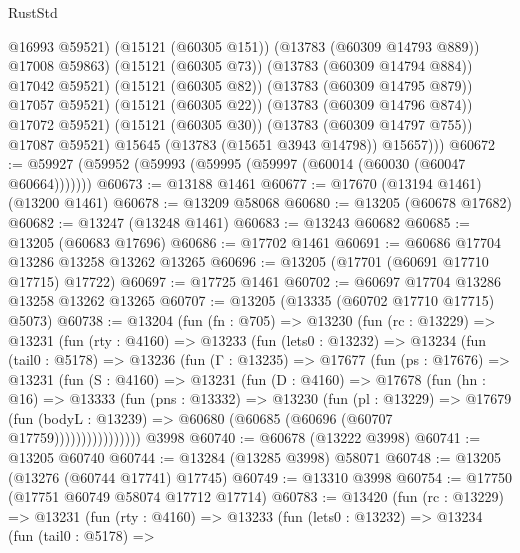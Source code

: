 \begin{lexlean}{RustStd}
\begin{coremodule}
                      @16993
                      @59521)
                    (@15121 (@60305 @151))
                    (@13783 (@60309 @14793 @889))
                    @17008
                    @59863)
                  (@15121 (@60305 @73))
                  (@13783 (@60309 @14794 @884))
                  @17042
                  @59521)
                (@15121 (@60305 @82))
                (@13783 (@60309 @14795 @879))
                @17057
                @59521)
              (@15121 (@60305 @22))
              (@13783 (@60309 @14796 @874))
              @17072
              @59521)
            (@15121 (@60305 @30))
            (@13783 (@60309 @14797 @755))
            @17087
            @59521)
          @15645
          (@13783 (@15651 @3943 @14798))
          @15657)))
@60672 := @59927 (@59952 (@59993 (@59995 (@59997 (@60014 (@60030 (@60047 @60664)))))))
@60673 := @13188 @1461
@60677 := @17670 (@13194 @1461) (@13200 @1461)
@60678 := @13209 @58068
@60680 := @13205 (@60678 @17682)
@60682 := @13247 (@13248 @1461)
@60683 := @13243 @60682
@60685 := @13205 (@60683 @17696)
@60686 := @17702 @1461
@60691 := @60686 @17704 @13286 @13258 @13262 @13265
@60696 := @13205 (@17701 (@60691 @17710 @17715) @17722)
@60697 := @17725 @1461
@60702 := @60697 @17704 @13286 @13258 @13262 @13265
@60707 := @13205 (@13335 (@60702 @17710 @17715) @5073)
@60738 := @13204
    (fun (fn : @705) =>
    @13230
      (fun (rc : @13229) =>
      @13231
        (fun (rty : @4160) =>
        @13233
          (fun (lets0 : @13232) =>
          @13234
            (fun (tail0 : @5178) =>
            @13236
              (fun (Γ : @13235) =>
              @17677
                (fun (ps : @17676) =>
                @13231
                  (fun (S : @4160) =>
                  @13231
                    (fun (D : @4160) =>
                    @17678
                      (fun (hn : @16) =>
                      @13333
                        (fun (pns : @13332) =>
                        @13230
                          (fun (pl : @13229) =>
                          @17679
                            (fun (bodyL : @13239) =>
                            @60680 (@60685 (@60696 (@60707 @17759))))))))))))))))
    @3998
@60740 := @60678 (@13222 @3998)
@60741 := @13205 @60740
@60744 := @13284 (@13285 @3998) @58071
@60748 := @13205 (@13276 (@60744 @17741) @17745)
@60749 := @13310 @3998
@60754 := @17750 (@17751 @60749 @58074 @17712 @17714)
@60783 := @13420
    (fun (rc : @13229) =>
    @13231
      (fun (rty : @4160) =>
      @13233
        (fun (lets0 : @13232) =>
        @13234
          (fun (tail0 : @5178) =>

\end{coremodule}
\end{lexlean}
